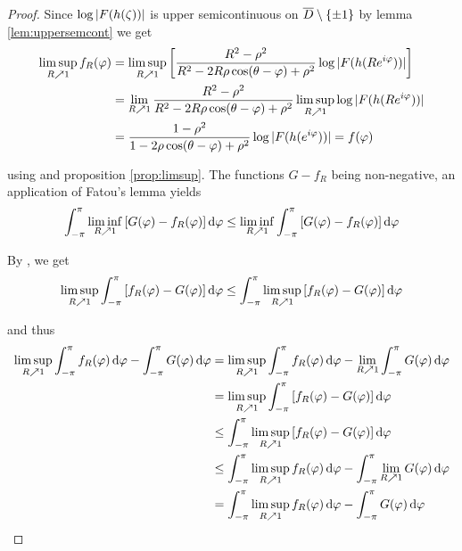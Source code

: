 \begin{proof}
Since $\log\abs[0]{ F(h(\zeta))}$ is upper semicontinuous on $\overline{D} \setminus \cbr[0]{ \pm 1}$ by lemma \ref{lem:uppersemcont} we get
\begin{equation*}
	\begin{aligned}
		\limsup_{R \nearrow 1}f_R(\varphi) &= \limsup_{R \nearrow 1} \sbr[3]{ \frac{R^2 - \rho^2}{R^2 - 2R\rho\cos(\theta - \varphi) + \rho^2}\log\abs[0]{ F(h(Re^{i\varphi}))}}\\
		&= \lim_{R \nearrow 1} \frac{R^2 - \rho^2}{R^2 - 2R\rho\cos(\theta - \varphi) + \rho^2}\limsup_{R \nearrow 1} \log\abs[0]{ F(h(Re^{i\varphi}))}\\
		&= \frac{1 - \rho^2}{1 - 2\rho\cos(\theta - \varphi) + \rho^2}\log\abs[0]{ F(h(e^{i\varphi}))} = f(\varphi)
	\end{aligned}
\end{equation*}

\noindent using \cite[363]{bourbaki:general_topology:1995} and proposition \ref{prop:limsup}. The functions $G - f_R$ being non-negative, an application of Fatou's lemma yields
\begin{equation*}
	\int_{-\pi}^\pi \liminf_{R \nearrow 1}\sbr[0]{ G(\varphi) - f_R(\varphi)}\d\varphi \leq \liminf_{R \nearrow 1} \int_{-\pi}^\pi \sbr[0]{ G(\varphi) - f_R(\varphi)}\d\varphi
\end{equation*}

By \cite[354]{bourbaki:general_topology:1995}, we get
\begin{equation*}
	\limsup_{R \nearrow 1} \int_{-\pi}^\pi \sbr[0]{ f_R(\varphi) - G(\varphi)}\d \varphi \leq \int_{-\pi}^\pi \limsup_{R \nearrow 1}\sbr[0]{ f_R(\varphi) - G(\varphi)}\d\varphi
\end{equation*}

\noindent and thus
\begin{equation*}
\begin{aligned}
	\limsup_{R \nearrow 1} \int_{-\pi}^\pi f_R(\varphi) \d\varphi - \int_{-\pi}^\pi G(\varphi)\d\varphi &= \limsup_{R \nearrow 1} \int_{-\pi}^\pi f_R(\varphi) \d\varphi - \lim_{R \nearrow 1}\int_{-\pi}^\pi G(\varphi)\d\varphi\\
	&= \limsup_{R \nearrow 1}\int_{-\pi}^\pi \sbr[0]{ f_R(\varphi) - G(\varphi)}\d\varphi\\
	&\leq \int_{-\pi}^\pi \limsup_{R \nearrow 1} \sbr[0]{f_R(\varphi) - G(\varphi)}\d\varphi\\
	&\leq \int_{-\pi}^\pi \limsup_{R \nearrow 1} f_R(\varphi) \d\varphi - \int_{-\pi}^\pi\lim_{R \nearrow 1} G(\varphi)\d\varphi\\
	&= \int_{-\pi}^\pi \limsup_{R \nearrow 1}f_R(\varphi) \d\varphi - \int_{-\pi}^\pi G(\varphi)\d\varphi
\end{aligned}
\end{equation*}


\end{proof}
